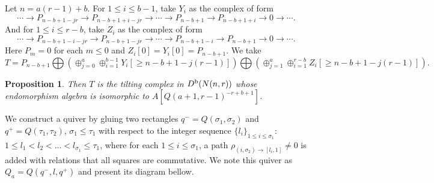 \documentclass[a4paper, reqno]{amsart}
\newtheorem{prop}[thm]{Proposition}
\theoremstyle{definition}
\theoremstyle{remark}
\numberwithin{equation}{section}
\begin{document}
Let $n=a(r-1)+b$. For $1\leq i\leq b-1$, take $Y_i$ as the complex of form
$$\cdots\rightarrow P_{n-b+1-jr}\rightarrow P_{n-b+1+i-jr}\rightarrow \cdots \rightarrow P_{n-b+1}\rightarrow P_{n-b+1+i}\rightarrow0\rightarrow\cdots.$$
And for $1\leq i\leq r-b$, take $Z_i$ as the complex of form
$$\cdots\rightarrow P_{n-b+1-i-jr}\rightarrow P_{n-b+1-jr}\rightarrow \cdots \rightarrow P_{n-b+1-i}\rightarrow P_{n-b+1}\rightarrow0\rightarrow\cdots.$$
Here $P_{m}=0$ for each $m\leq 0$ and $Z_{i}[0] = Y_{i}[0] = P_{n-b+1} $. We take
$$T=P_{n-b+1}\bigoplus(\oplus_{j=0}^{a}\oplus_{i=1}^{b-1}Y_i[\geq n-b+1-j(r-1)])\bigoplus(\oplus_{j= 1}^{a}\oplus_{i=1}^{r-b}Z_i[\geq n-b+1-j(r-1)]).$$

\begin{prop}
Then $T$ is the tilting complex in $D^{\textup{b}}(N(n,r))$ whose endomorphism algebra is isomorphic to $A[Q(a+1,r-1)^{-r+b+1}]$.
\end{prop}



We construct a quiver by gluing two rectangles $q^{-} = Q(\sigma_1,\sigma_2) $ and  $q^{+} = Q(\tau_1,\tau_2) $, $ \sigma_1\leq \tau_1$ with respect to the integer sequence $\{l_i\}_{1\leq i \leq \sigma_1}$: $ 1\leq l_1 < l_2 < \dots < l_{\sigma_1} \leq \tau_1$, where for each $1 \leq i\leq \sigma_1$, a path $ \rho_{(i,\sigma_2)\to [l_i,1]}\neq 0$ is added with relations that all squares are commutative. We note this quiver as ${Q}_{a}=Q(q^{-},l,q^{+})$ and present its diagram bellow.
\end{document}
